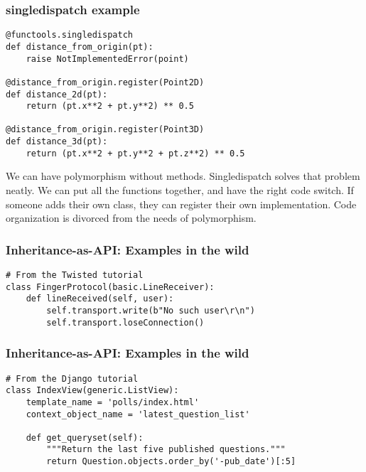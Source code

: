 \documentclass[ignorenonframetext,aspectration=169]{beamer}
\begin{document}
\begin{frame}[fragile]
\frametitle{singledispatch example}

\begin{lstlisting}
@functools.singledispatch
def distance_from_origin(pt):
    raise NotImplementedError(point)

@distance_from_origin.register(Point2D)
def distance_2d(pt):
    return (pt.x**2 + pt.y**2) ** 0.5

@distance_from_origin.register(Point3D)
def distance_3d(pt):
    return (pt.x**2 + pt.y**2 + pt.z**2) ** 0.5
\end{lstlisting}

\end{frame}

We can have polymorphism without methods.
Singledispatch solves that problem neatly.
We can put all the functions together,
and have the right code switch.
If someone adds their own class,
they can register their own implementation.
Code organization is divorced from the needs
of polymorphism.

\begin{frame}[fragile]
\frametitle{Inheritance-as-API: Examples in the wild}

\begin{lstlisting}
# From the Twisted tutorial
class FingerProtocol(basic.LineReceiver):
    def lineReceived(self, user):
        self.transport.write(b"No such user\r\n")
        self.transport.loseConnection()
\end{lstlisting}

\end{frame}

\begin{frame}[fragile]
\frametitle{Inheritance-as-API: Examples in the wild}

\begin{lstlisting}
# From the Django tutorial
class IndexView(generic.ListView):
    template_name = 'polls/index.html'
    context_object_name = 'latest_question_list'

    def get_queryset(self):
        """Return the last five published questions."""
        return Question.objects.order_by('-pub_date')[:5]
\end{lstlisting}

\end{frame}
\end{document}
